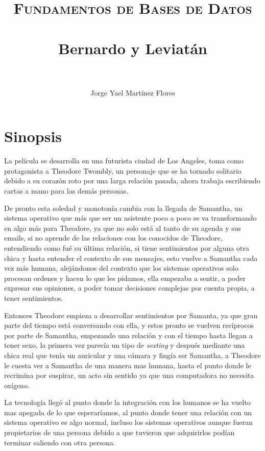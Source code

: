 \documentclass[paper=a4, fontsize=12pt]{scrartcl} %
\title{	
\normalfont \normalsize 
\textsc{Fundamentos de Bases de Datos} \\ [25pt] %
\horrule{0.5pt} \\[0.5cm] %
\huge Bernardo y Leviatán \\ %
\horrule{2pt} \\[0.5cm] %
}
\author{Jorge Yael Martínez Flores} %
\date{} %
\begin{document}
\maketitle %


\section{Sinopsis}

La película se desarrolla en una futurista ciudad de Los Angeles, toma como protagonista a Theodore Twombly, un personaje que se ha tornado solitario debido a su corazón roto por una larga relación pasada, ahora trabaja escribiendo  cartas a mano para las demás personas.\vspace{4mm}

De pronto esta soledad y monotonía cambia con la llegada de Samantha, un sistema operativo que más que ser un asistente poco a poco se va transformando en algo más para Theodore, ya que no solo está al tanto de su agenda y sus emails, si no aprende de las relaciones con los conocidos de Theodore, entendiendo como fué su última relación, si tiene sentimientos por alguna otra chica y hasta entender el contexto de sus mensajes, esto vuelve a Samantha cada vez más humana, alejándonos del contexto que los sistemas operativos solo procesan ordenes y hacen lo que les pidamos, ella empezaba a sentir, a poder expresar sus opiniones, a poder tomar decisiones complejas por cuenta propia, a tener sentimientos.\vspace{4mm}

Entonces Theodore empieza a desarrollar sentimientos por Samanta, ya que gran parte del tiempo está conversando con ella, y estos pronto se vuelven recíprocos por parte de Samantha, empezando una relación y con el tiempo hasta llegan a tener sexo, la primera vez parecía un tipo de \textit{sexting} y después mediante una chica real que tenía un auricular y una cámara y fingía ser Samantha, a Theodore le cuesta ver a Samantha de una manera mas humana, hasta el punto donde le recrimina por suspirar, un acto sin sentido ya que una computadora no necesita oxígeno.\vspace{4mm}

La tecnología llegó al punto donde la integración con los humanos se ha vuelto mas apegada de lo que esperaríamos, al punto donde tener una relación con un sistema operativo es algo normal, incluso los sistemas operativos aunque fueran propietarios de una persona debido a que tuvieron que adquirirlos podían terminar saliendo con otra persona.\vspace{4mm}
\end{document}
